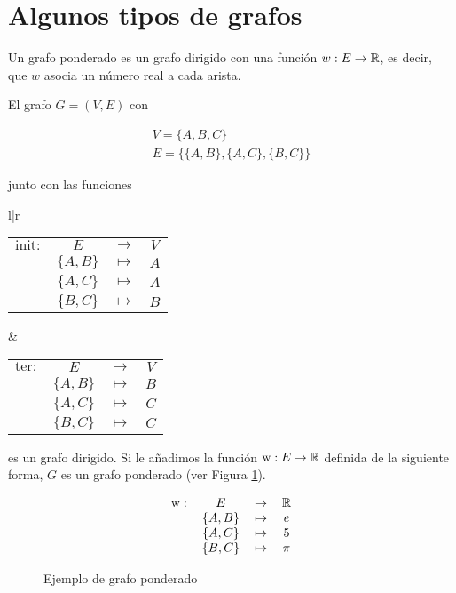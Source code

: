 \section{Algunos tipos de grafos}

\begin{defi}
Un grafo ponderado es un grafo dirigido con una función $w : E \to \mathbb{R}$, es decir, que $w$ asocia un número real a cada arista.
\end{defi}

\begin{ejemplo}
El grafo $G = (V,E)$ con 

\begin{eqnarray}
V = \{A, B, C\}\\
E = \{ \{A,B\}, \{A,C\}, \{B,C\} \}
\end{eqnarray} 

junto con las funciones

\begin{center}
\begin{tabular}{l|r}
\begin{tabular}{r c c c}
$\mathrm{init}:$ & $E$ & $\to$ & $V$\\
			     & $\{A,B\}$ & $\mapsto$ & $A$\\
			     & $\{A,C\}$ & $\mapsto$ & $A$\\
			     & $\{B,C\}$ & $\mapsto$ & $B$
			      
\end{tabular} &
\begin{tabular}{r c c c}
$\mathrm{ter}:$ & $E$ & $\to$ & $V$\\
			     & $\{A,B\}$ & $\mapsto$ & $B$\\
			     & $\{A,C\}$ & $\mapsto$ & $C$\\
			     & $\{B,C\}$ & $\mapsto$ & $C$
			    
\end{tabular} 
\end{tabular}
\end{center}

es un grafo dirigido. Si le añadimos la función $\mathrm{w} : E \to \mathbb{R}$ definida de la siguiente forma, $G$ es un grafo ponderado (ver Figura \ref{fig:grafo_ponderado}).

\begin{equation*}
\begin{tabular}{r c c c}
$\mathrm{w}:$ & $E$ & $\to$ & $\R$\\
			     & $\{A,B\}$ & $\mapsto$ & $e$\\
			     & $\{A,C\}$ & $\mapsto$ & $5$\\
			     & $\{B,C\}$ & $\mapsto$ & $\pi$
			      
\end{tabular}
\end{equation*}
\begin{figure}[htb]
\centering
\ejemplografoponderado
\caption{Ejemplo de grafo ponderado}
\label{fig:grafo_ponderado}
\end{figure} 
\end{ejemplo}

